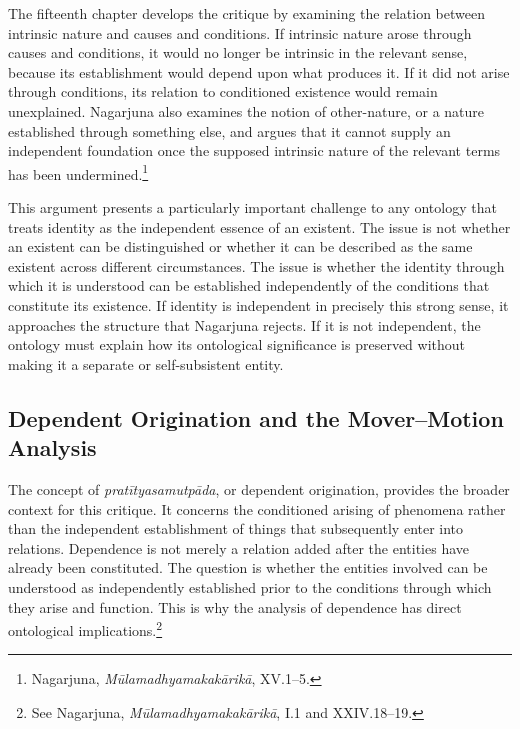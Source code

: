 \label{para:VS.B01.P01.C08.S18.SS05.P001}
The fifteenth chapter develops the critique by examining the relation between intrinsic nature and causes and conditions. If intrinsic nature arose through causes and conditions, it would no longer be intrinsic in the relevant sense, because its establishment would depend upon what produces it. If it did not arise through conditions, its relation to conditioned existence would remain unexplained. Nagarjuna also examines the notion of other-nature, or a nature established through something else, and argues that it cannot supply an independent foundation once the supposed intrinsic nature of the relevant terms has been undermined.\footnote{Nagarjuna, \emph{M\={u}lamadhyamakak\={a}rik\={a}}, XV.1--5.}

\label{para:VS.B01.P01.C08.S18.SS05.P002}
This argument presents a particularly important challenge to any ontology that treats identity as the independent essence of an existent. The issue is not whether an existent can be distinguished or whether it can be described as the same existent across different circumstances. The issue is whether the identity through which it is understood can be established independently of the conditions that constitute its existence. If identity is independent in precisely this strong sense, it approaches the structure that Nagarjuna rejects. If it is not independent, the ontology must explain how its ontological significance is preserved without making it a separate or self-subsistent entity.

\subsection{Dependent Origination and the Mover--Motion Analysis}
\label{subsec:ch08_s18_ss06}

\label{para:VS.B01.P01.C08.S18.SS06.P001}
The concept of \emph{prat\={i}tyasamutp\={a}da}, or dependent origination, provides the broader context for this critique. It concerns the conditioned arising of phenomena rather than the independent establishment of things that subsequently enter into relations. Dependence is not merely a relation added after the entities have already been constituted. The question is whether the entities involved can be understood as independently established prior to the conditions through which they arise and function. This is why the analysis of dependence has direct ontological implications.\footnote{See Nagarjuna, \emph{M\={u}lamadhyamakak\={a}rik\={a}}, I.1 and XXIV.18--19.}

